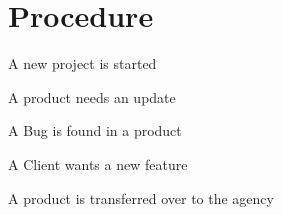 \section*{Procedure}

A new project is started

A product needs an update

A Bug is found in a product 

A Client wants a new feature

A product is transferred over to the agency

